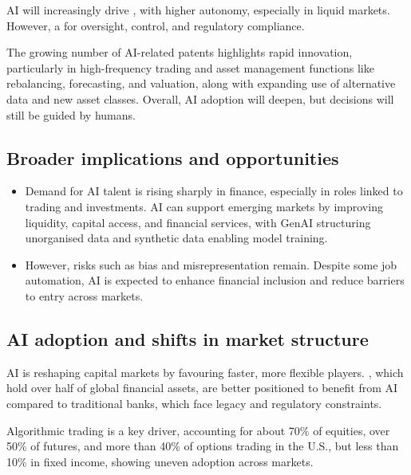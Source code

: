 AI will increasingly drive , with higher autonomy,
especially in liquid markets. However, a 
for oversight, control, and regulatory compliance.

The growing number of AI-related patents highlights rapid innovation, particularly in
high-frequency trading and asset management functions like rebalancing, forecasting, and
valuation, along with expanding use of alternative data and new asset classes. Overall, AI
adoption will deepen, but decisions will still be guided by humans.

\subsection*{Broader implications and opportunities}

\begin{itemize}
\item Demand for AI talent is rising sharply in finance, especially in roles linked to
trading and investments. AI can support emerging markets by improving liquidity, capital
access, and financial services, with GenAI structuring unorganised data and synthetic data
enabling model training.
\item However, risks such as bias and misrepresentation remain. Despite some job
automation, AI is expected to enhance financial inclusion and reduce barriers to entry
across markets.
\end{itemize}


\subsection*{AI adoption and shifts in market structure}

AI is reshaping capital markets by favouring faster, more flexible players. ,
which hold over half of global financial assets, are better positioned to benefit from AI
compared to traditional banks, which face legacy and regulatory constraints.

Algorithmic trading is a key driver, accounting for about 70\% of equities, over 50\% of
futures, and more than 40\% of options trading in the U.S., but less than 10\% in fixed
income, showing uneven adoption across markets.

